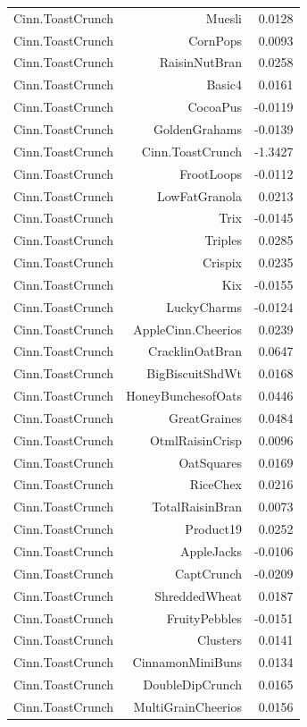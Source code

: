 \begin{longtable}{@{}lrr@{}}
Cinn.ToastCrunch & Muesli & 0.0128 \\
Cinn.ToastCrunch & CornPops & 0.0093 \\
Cinn.ToastCrunch & RaisinNutBran & 0.0258 \\
Cinn.ToastCrunch & Basic4 & 0.0161 \\
Cinn.ToastCrunch & CocoaPus & -0.0119 \\
Cinn.ToastCrunch & GoldenGrahams & -0.0139 \\
Cinn.ToastCrunch & Cinn.ToastCrunch & -1.3427 \\
Cinn.ToastCrunch & FrootLoops & -0.0112 \\
Cinn.ToastCrunch & LowFatGranola & 0.0213 \\
Cinn.ToastCrunch & Trix & -0.0145 \\
Cinn.ToastCrunch & Triples & 0.0285 \\
Cinn.ToastCrunch & Crispix & 0.0235 \\
Cinn.ToastCrunch & Kix & -0.0155 \\
Cinn.ToastCrunch & LuckyCharms & -0.0124 \\
Cinn.ToastCrunch & AppleCinn.Cheerios & 0.0239 \\
Cinn.ToastCrunch & CracklinOatBran & 0.0647 \\
Cinn.ToastCrunch & BigBiscuitShdWt & 0.0168 \\
Cinn.ToastCrunch & HoneyBunchesofOats & 0.0446 \\
Cinn.ToastCrunch & GreatGraines & 0.0484 \\
Cinn.ToastCrunch & OtmlRaisinCrisp & 0.0096 \\
Cinn.ToastCrunch & OatSquares & 0.0169 \\
Cinn.ToastCrunch & RiceChex & 0.0216 \\
Cinn.ToastCrunch & TotalRaisinBran & 0.0073 \\
Cinn.ToastCrunch & Product19 & 0.0252 \\
Cinn.ToastCrunch & AppleJacks & -0.0106 \\
Cinn.ToastCrunch & CaptCrunch & -0.0209 \\
Cinn.ToastCrunch & ShreddedWheat & 0.0187 \\
Cinn.ToastCrunch & FruityPebbles & -0.0151 \\
Cinn.ToastCrunch & Clusters & 0.0141 \\
Cinn.ToastCrunch & CinnamonMiniBuns & 0.0134 \\
Cinn.ToastCrunch & DoubleDipCrunch & 0.0165 \\
Cinn.ToastCrunch & MultiGrainCheerios & 0.0156 \\

\end{longtable}
